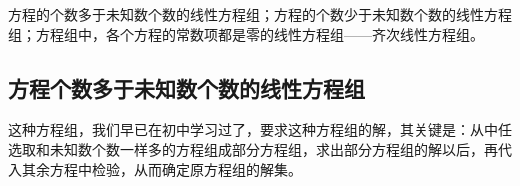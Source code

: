 方程的个数多于未知数个数的线性方程组；方程的个数少于未知数个数的线性方程组；方程组中，各个方程的常数项都是零的线性方程组——齐次线性方程组。

\subsection{方程个数多于未知数个数的线性方程组}

这种方程组，我们早已在初中学习过了，要求这种方程组的解，其关键是：从中任选取和未知数个数一样多的方程组成部分方程组，求出部分方程组的解以后，再代入其余方程中检验，从而确定原方程组的解集。









































































